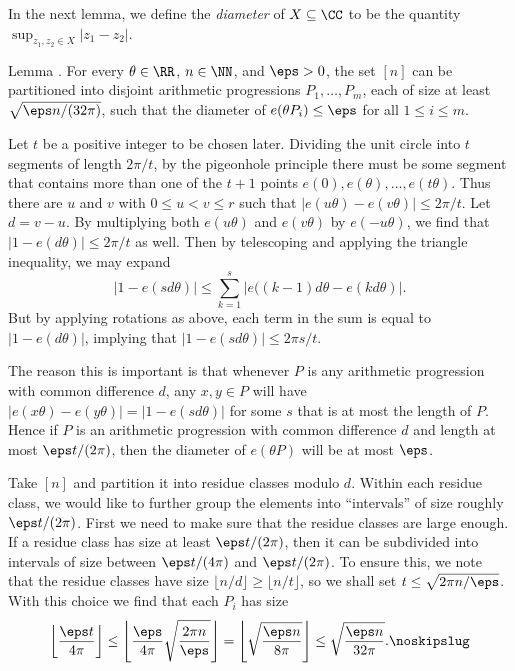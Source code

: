 In the next lemma, we define the {\it diameter} of $X\subseteq \CC$ to be the quantity
$\sup_{z_1,z_2\in X} |z_1-z_2|$.

\proclaim Lemma {\advthm}. For every $\theta\in \RR$, $n\in \NN$, and $\eps > 0$, the
set $[n]$ can be partitioned
into disjoint arithmetic progressions $P_1, \ldots, P_m$, each of size at least $\sqrt{\eps n/(32 \pi)}$,
such that the diameter of $e(\theta P_i)\le \eps$ for all $1\le i\le m$.

\proof Let $t$ be a positive integer to be chosen later. Dividing the unit circle into $t$ segments of
length $2\pi/t$, by the pigeonhole principle there must be some segment that contains more than one of
the $t+1$ points $e(0), e(\theta), \ldots, e(t\theta)$. Thus there are $u$ and $v$ with $0\le u<v\le r$ such that
$\bigl|e(u\theta) - e(v\theta)\bigr|\le 2\pi/t$. Let $d = v-u$. By multiplying both $e(u\theta)$ and
$e(v\theta)$ by $e(-u\theta)$, we find that $\bigl|1-e(d\theta)\bigr| \le 2\pi/t$ as well. Then by telescoping and
applying the triangle inequality, we may expand
$$\bigl|1-e(sd\theta)\bigl| \le \sum_{k=1}^s \bigl|e\bigl((k-1)d\theta-e(kd\theta)\bigr|.$$
But by applying rotations as above, each term in the sum is equal to $\bigl|1-e(d\theta)\bigr|$,
implying that $\bigl|1-e(sd\theta)\bigl| \le 2\pi s/t$.

The reason this is important is that
whenever $P$ is any arithmetic progression with common difference $d$, any $x,y\in P$ will
have $\bigl|e(x\theta) - e(y\theta)\bigr| = \bigl|1-e(sd\theta)\bigr|$ for some $s$ that is at most
the length of $P$. Hence if $P$ is an arithmetic progression with common difference $d$ and length
at most $\eps t/(2\pi)$, then the diameter of $e(\theta P)$ will be at most $\eps$.

Take $[n]$ and partition it into residue classes modulo $d$. Within each residue class, we would like
to further group the elements into ``intervals'' of size roughly $\eps t/(2\pi)$. First we need to make
sure that the residue classes are large enough. If a residue class has size at least $\eps t/(2\pi)$,
then it can be subdivided into intervals of size between $\eps t/(4\pi)$ and $\eps t/(2\pi)$.
To ensure this, we note that the residue classes have size $\lfloor n/d\rfloor \ge \lfloor n/t\rfloor$,
so we shall set $t \le \sqrt{2\pi n / \eps}$. With this choice we find that each $P_i$ has size
$$\biggl\lfloor {\eps t\over 4\pi}\biggr\rfloor \le  \Biggl\lfloor {\eps\over 4\pi} \sqrt{2\pi n\over \eps}
\Biggr\rfloor = \Biggl\lfloor \sqrt{\eps n\over 8\pi} \Biggr\rfloor \le \sqrt{\eps n\over 32\pi}.\noskipslug$$


